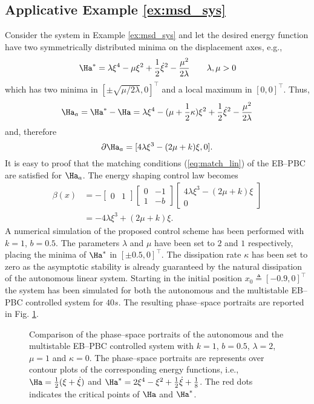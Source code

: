 \subsection{Applicative Example \ref{ex:msd_sys}}
%
Consider the system in Example \ref{ex:msd_sys} and let the desired energy function have two symmetrically distributed minima on the displacement axes, e.g.,
\[\Ha^* = \lambda\xi^4-\mu\xi^2 + \frac{1}{2}\dot{\xi}^2- \frac{\mu^2}{2\lambda}\qquad\lambda,\mu>0\]
which has two minima in $[\pm\sqrt{\mu/2\lambda},0]^\top$ and a local maximum in $[0,0]^\top$. Thus, 
\[\Ha_a = \Ha^* - \Ha = \lambda\xi^4-(\mu+\frac{1}{2}\kappa)\xi^2 + \frac{1}{2}\dot{\xi}^2- \frac{\mu^2}{2\lambda}\]
and, therefore
\[\partial\Ha_a = [4\lambda\xi^3-(2\mu + k)\xi,0].\]
It is easy to proof that the matching conditions (\ref{eq:match_lin}) of the EB--PBC are satisfied for $\Ha_a$. The energy shaping control law becomes
%
\begin{align}\label{eq:ex_ctrl}
    \beta(x) &= -\begin{bmatrix}0&1\end{bmatrix}\begin{bmatrix}0&-1\\1&-b\end{bmatrix}\begin{bmatrix}4\lambda\xi^3-(2\mu + k)\xi\\0\end{bmatrix}\nonumber\\
             &= -4\lambda\xi^3+(2\mu + k)\xi.
\end{align}
%
A numerical simulation of the proposed control scheme has been performed with $k = 1$, $b = 0.5$. The parameters $\lambda$ and $\mu$ have been set to $2$ and $1$ respectively, placing the minima of $\Ha^*$ in $[\pm0.5,0]^\top$. The dissipation rate $\kappa$ has been set to zero as the asymptotic stability is already guaranteed by the natural dissipation of the autonomous linear system. Starting in the initial position $x_0 \triangleq [-0.9,0]^\top$ the system has been simulated for both the  autonomous and the multistable EB--PBC controlled system for $40s$. The resulting phase--space portraits are reported in Fig. \ref{fig:ctrl_ps}.
%
\begin{figure}[b]
    \centering
    
    \vspace{-7mm}
    \caption{\footnotesize Comparison of the phase--space portraits of the autonomous and the multistable EB--PBC controlled system with $k = 1$, $b = 0.5$, $\lambda = 2$, $\mu = 1$ and $\kappa = 0$. The phase--space portraits are represents over contour plots of the corresponding energy functions, i.e., $\Ha = \frac{1}{2}(\xi + \dot{\xi})$ and  $\Ha^* =  2\xi^4 - \xi^2 + \frac{1}{2}\dot{\xi} + \frac{1}{8}$. The red dots indicates the critical points of $\Ha$ and $\Ha^*$.}
    \label{fig:ctrl_ps}
\end{figure}
